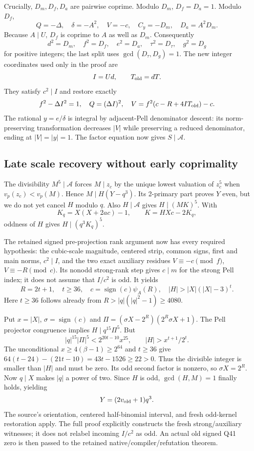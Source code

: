 Crucially, $D_m,D_f,D_a$ are pairwise coprime. Modulo $D_m$,
$D_f=D_a=1$. Modulo $D_f$,
\[
 Q=-\Delta,\quad\delta=-A^2,\quad V=-c,\quad C_y=-D_m,
 \quad D_a=A^2D_m.
\]
Because $A\mid U$, $D_f$ is coprime to $A$ as well as $D_m$.
Consequently
\[
 d^2=D_m,\quad f^2=D_f,\quad e^2=D_a,\quad
 \tau^2=D_\tau,\quad g^2=D_g
\]
for positive integers; the last split uses $\gcd(D_\tau,D_g)=1$.
The new integer coordinates used only in the proof are
\[
 I=Ud,\qquad T_{\rm old}=dT.
\]
They satisfy $c^2\mid I$ and restore exactly
\[
 f^2-\Delta I^2=1,\quad Q=(\Delta I)^2,\quad
 V=f^2(c-R+4IT_{\rm old})-c.
\]
The rational $y=e/\delta$ is integral by adjacent-Pell denominator
descent: its norm-preserving transformation decreases $|V|$ while
preserving a reduced denominator, ending at $|V|=|y|=1$.
The factor equation now gives $S\mid\mathcal A$.

\subsection{Late scale recovery without early coprimality}
The divisibility $M^5\mid\mathcal A$ forces $M\mid z_c$ by the
unique lowest valuation of $z_c^5$ when $v_p(z_c)<v_p(M)$.
Hence $M\mid H(Y-q^3)$. Its 2-primary part proves $Y$ even, but
we do not yet cancel $H$ modulo $q$.
Also $H\mid\mathcal A$ gives $H\mid(MK)^5$. With
\[
 K_q=X(X+2ac)-1,\qquad K=HXc-2K_q,
\]
oddness of $H$ gives $H\mid(q^3K_q)^5$.

The retained signed pre-projection rank argument now has every required
hypothesis: the cubic-scale magnitude, centered strip, common signs,
first and main norms, $c^2\mid I$, and the two exact auxiliary residues
$V\equiv-c\pmod f$, $V\equiv-R\pmod c$.
Its nonodd strong-rank step gives $c\mid m$ for the strong Pell index;
it does not assume that $I/c^2$ is odd. It yields
\[
 R=2t+1,\quad t\ge36,\quad
 c=\operatorname{sign}(c)\psi_A(R),\quad
 |H|>|X|(|X|-3)^t.
\]
Here $t\ge36$ follows already from
$R>|q|(|q|^2-1)\ge4080$.

Put $x=|X|$, $\sigma=\operatorname{sign}(c)$ and
$\Pi=(\sigma X-2^R)(2^R\sigma X+1)$.
The Pell projector congruence implies $H\mid q^{15}\Pi^5$.
But
\[
 |q|^{15}|\Pi|^5<2^{20t-10}x^{25},\qquad
 |H|>x^{t+1}/2^t.
\]
The unconditional $x\ge4(\beta-1)\ge2^{64}$ and $t\ge36$ give
$64(t-24)-(21t-10)=43t-1526\ge22>0$.
Thus the divisible integer is smaller than $|H|$ and must be zero.
Its odd second factor is nonzero, so $\sigma X=2^R$.
Now $q\mid X$ makes $|q|$ a power of two. Since $H$ is odd,
$\gcd(H,M)=1$ finally holds, yielding
\[
 Y=(2v_{\rm old}+1)q^3.
\]
The source's orientation, centered half-binomial interval, and fresh
odd-kernel restoration apply. The full proof explicitly constructs the
fresh strong/auxiliary witnesses; it does not relabel incoming $I/c^2$
as odd. An actual old signed Q41 zero is then passed to the retained
native/compiler/refutation theorem.


